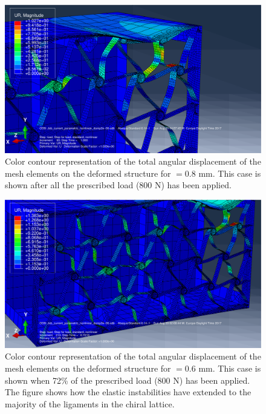     \begin{figure}[!htpb] %
      \centering
      \includegraphics[width=0.8 \textwidth]{../figures/result-sim/cbox/0coma8-800N-2}
      \caption[Color contour representation of the total angular displacement of the mesh elements on the deformed structure for \boxt$ = 0.8$ mm]{Color contour representation of the total angular displacement of the mesh elements on the deformed structure for \boxt$ = 0.8$ mm. This case is shown after all the prescribed load (800 N) has been applied.}\label{fig:0coma8-800N-cbox_t}
    \end{figure}

    \begin{figure}[!htpb] %
      \centering
      \includegraphics[width=0.8 \textwidth]{../figures/result-sim/cbox/0coma6-800N-2}
      \caption[Color contour representation of the total angular displacement of the mesh elements on the deformed structure for \boxt$ = 0.6$ mm]{Color contour representation of the total angular displacement of the mesh elements on the deformed structure for \boxt$ = 0.6$ mm. This case is shown when 72\% of the prescribed load (800 N) has been applied. The figure shows how the elastic instabilities have extended to the majority of the ligaments in the chiral lattice.}\label{fig:0coma6-800N-cbox_t}
    \end{figure}

